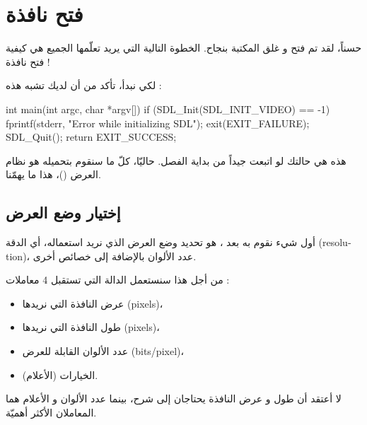\section{فتح نافذة}

حسناً، لقد تم فتح و غلق المكتبة بنجاح. الخطوة التالية التي يريد تعلّمها الجميع هي كيفية فتح نافذة ! 

لكي نبدأ، تأكد من أن لديك
تشبه هذه :

\begin{Csource}
int main(int argc, char *argv[])
{
	if (SDL_Init(SDL_INIT_VIDEO) == -1)
	{
		fprintf(stderr, "Error while initializing SDL");
		exit(EXIT_FAILURE);
	}
	SDL_Quit();
	return EXIT_SUCCESS;
}
\end{Csource}

هذه هي حالتك لو اتبعت جيداً من بداية الفصل. حاليّا، كلّ ما سنقوم بتحميله هو نظام العرض
()،
هذا ما يهمّنا.
\subsection{إختيار وضع العرض}

أول شيء نقوم به بعد 
،
هو تحديد وضع العرض الذي نريد استعماله، أي الدقة
(\textenglish{resolution})،
عدد الألوان بالإضافة إلى خصائص أخرى.

من أجل هذا سنستعمل الدالة
التي تستقبل 4 معاملات :

\begin{itemize}
	\item عرض النافذة التي نريدها
	(\textenglish{pixels})،
	\item طول النافذة التي نريدها
	(\textenglish{pixels})،
	\item عدد الألوان القابلة للعرض
	(\textenglish{bits/pixel})،
	\item الخيارات (الأعلام).
\end{itemize}

لا أعتقد أن طول و عرض النافذة يحتاجان إلى شرح، بينما عدد الألوان و الأعلام هما المعاملان الأكثر أهميّة.


